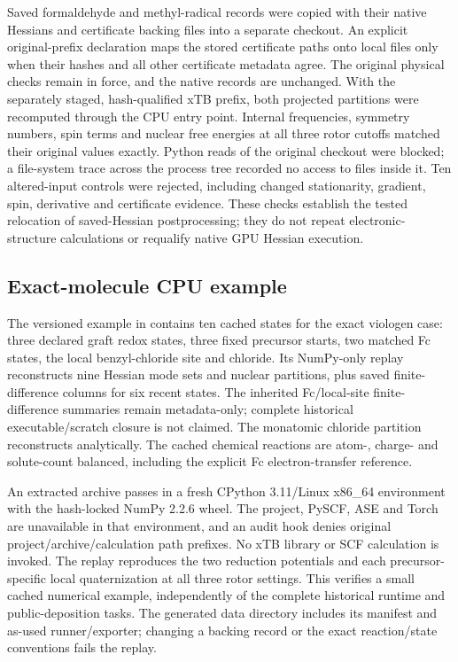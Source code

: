 \documentclass[11pt]{article}
\begin{document}
Saved formaldehyde and methyl-radical records were copied with their native Hessians and certificate backing files into a separate checkout. An explicit original-prefix declaration maps the stored certificate paths onto local files only when their hashes and all other certificate metadata agree. The original physical checks remain in force, and the native records are unchanged. With the separately staged, hash-qualified xTB prefix, both projected partitions were recomputed through the CPU entry point. Internal frequencies, symmetry numbers, spin terms and nuclear free energies at all three rotor cutoffs matched their original values exactly. Python reads of the original checkout were blocked; a file-system trace across the process tree recorded no access to files inside it. Ten altered-input controls were rejected, including changed stationarity, gradient, spin, derivative and certificate evidence. These checks establish the tested relocation of saved-Hessian postprocessing; they do not repeat electronic-structure calculations or requalify native GPU Hessian execution.

\subsection{Exact-molecule CPU example}
The versioned example in  contains ten cached states for the exact viologen case: three declared graft redox states, three fixed precursor starts, two matched Fc states, the local benzyl-chloride site and chloride. Its NumPy-only replay reconstructs nine Hessian mode sets and nuclear partitions, plus saved finite-difference columns for six recent states. The inherited Fc/local-site finite-difference summaries remain metadata-only; complete historical executable/scratch closure is not claimed. The monatomic chloride partition reconstructs analytically. The cached chemical reactions are atom-, charge- and solute-count balanced, including the explicit Fc electron-transfer reference.

An extracted archive passes in a fresh CPython 3.11/Linux x86\_64 environment with the hash-locked NumPy 2.2.6 wheel. The project, PySCF, ASE and Torch are unavailable in that environment, and an audit hook denies original project/archive/calculation path prefixes. No xTB library or SCF calculation is invoked. The replay reproduces the two reduction potentials and each precursor-specific local quaternization at all three rotor settings. This verifies a small cached numerical example, independently of the complete historical runtime and public-deposition tasks. The generated data directory includes its manifest and as-used runner/exporter; changing a backing record or the exact reaction/state conventions fails the replay.
\end{document}
